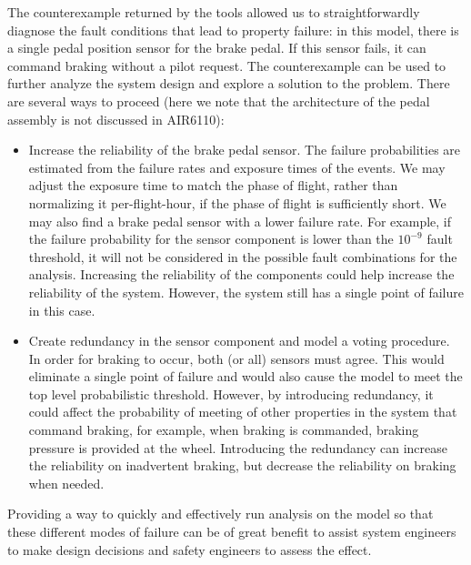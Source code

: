 The counterexample returned by the tools allowed us to straightforwardly diagnose the fault conditions that lead to property failure: in this model, there is a single pedal position sensor for the brake pedal. If this sensor fails, it can command braking without a pilot request. The counterexample can be used to further analyze the system design and explore a solution to the problem. There are several ways to proceed (here we note that the architecture of the pedal assembly is not discussed in AIR6110):
	\begin{itemize}
	\renewcommand{\labelitemi}{\textbullet}
	\item Increase the reliability of the brake pedal sensor. The failure probabilities are estimated from the failure rates and exposure times of the events. We may adjust the exposure time to match the phase of flight, rather than normalizing it per-flight-hour, if the phase of flight is sufficiently short. We may also find a brake pedal sensor with a lower failure rate. For example, if the failure probability for the sensor component is lower than the $10^{-9}$ fault threshold, it will not be considered in the possible fault combinations for the analysis. Increasing the reliability of the components could help increase the reliability of the system. However, the system still has a single point of failure in this case.
	
	\item Create redundancy in the sensor component and model a voting procedure.
	In order for braking to occur, both (or all) sensors must agree. This would eliminate a single point of failure and would also cause the model to meet the top level probabilistic threshold. However, by introducing redundancy, it could affect the probability of meeting of other properties in the system that command braking, for example, when braking is commanded, braking pressure is provided at the wheel. Introducing the redundancy can increase the reliability on inadvertent braking, but decrease the reliability on braking when needed.
\end{itemize}

Providing a way to quickly and effectively run analysis on the model so that these different modes of failure can be of great benefit to assist system engineers to make design decisions and safety engineers to assess the effect.

